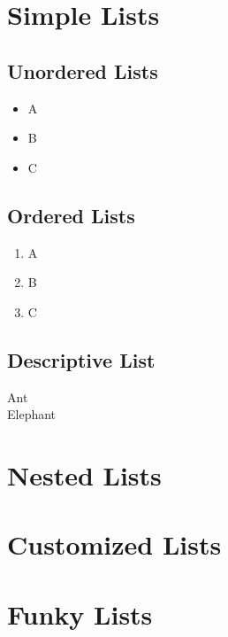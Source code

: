 \documentclass{article}
\begin{document}
\section{Simple Lists}
\subsection{Unordered Lists}
\begin{itemize}
	\item A
	\item B
	\item C
\end{itemize}

\subsection{Ordered Lists}
\begin{enumerate}
	\item A
	\item B
	\item C
\end{enumerate}

\subsection{Descriptive List}
\begin{description}
	\item [Ant] \blindtext
	\item [Elephant] \blindtext
\end{description}


\section{Nested Lists}

\section{Customized Lists}

\section{Funky Lists}
\end{document}
